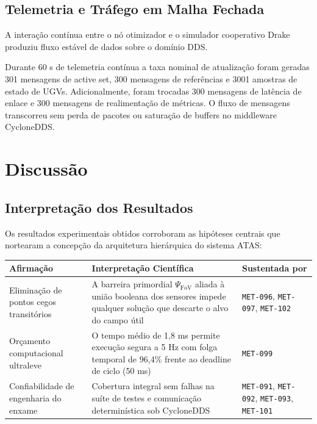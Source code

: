 \documentclass[
  brazilian,
  a4paper]{article}
\newcounter{none} %
\begin{document}
\subsection{Telemetria e Tráfego em Malha
Fechada}\label{telemetria-e-truxe1fego-em-malha-fechada}

A interação contínua entre o nó otimizador e o simulador cooperativo
Drake produziu fluxo estável de dados sobre o domínio DDS.

Durante 60 s de telemetria contínua a taxa nominal de atualização foram
geradas 301 mensagens de active set, 300 mensagens de referências e 3001
amostras de estado de UGVs. Adicionalmente, foram trocadas 300 mensagens
de latência de enlace e 300 mensagens de realimentação de métricas. O
fluxo de mensagens transcorreu sem perda de pacotes ou saturação de
buffers no middleware CycloneDDS.

\section{Discussão}\label{discussuxe3o}

\subsection{Interpretação dos
Resultados}\label{interpretauxe7uxe3o-dos-resultados}

Os resultados experimentais obtidos corroboram as hipóteses centrais que
nortearam a concepção da arquitetura hierárquica do sistema ATAS:

{\def\LTcaptype{none} %
\begin{longtable}[]{@{}
  >{\raggedright\arraybackslash}p{}
  >{\raggedright\arraybackslash}p{}
  >{\raggedright\arraybackslash}p{}@{}}
\toprule\noalign{}
\begin{minipage}[b]{\linewidth}\raggedright
Afirmação
\end{minipage} & \begin{minipage}[b]{\linewidth}\raggedright
Interpretação Científica
\end{minipage} & \begin{minipage}[b]{\linewidth}\raggedright
Sustentada por
\end{minipage} \\
\midrule\noalign{}
\endhead
\bottomrule\noalign{}
\endlastfoot
Eliminação de pontos cegos transitórios & A barreira primordial
\(\Psi_{\text{FoV}}\) aliada à união booleana dos sensores impede
qualquer solução que descarte o alvo do campo útil & \texttt{MET-096},
\texttt{MET-097}, \texttt{MET-102} \\
Orçamento computacional ultraleve & O tempo médio de 1,8 ms permite
execução segura a 5 Hz com folga temporal de 96,4\% frente ao deadline
de ciclo (50 ms) & \texttt{MET-099} \\
Confiabilidade de engenharia do enxame & Cobertura integral sem falhas
na suíte de testes e comunicação determinística sob CycloneDDS &
\texttt{MET-091}, \texttt{MET-092}, \texttt{MET-093},
\texttt{MET-101} \\
\end{longtable}
}
\end{document}
